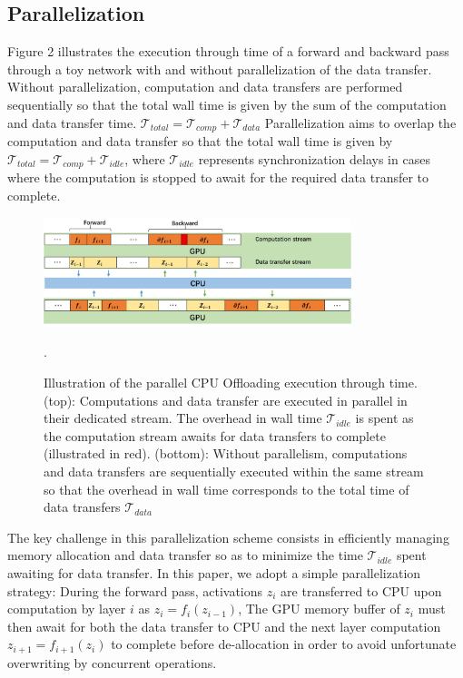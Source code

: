 \documentclass[11pt,onecolumn]{article}
\begin{document}
\subsection{Parallelization}

Figure 2 illustrates the execution through time of a forward 
and backward pass through a toy network with and without parallelization of the data transfer.
Without parallelization, computation and data transfers are performed sequentially 
so that the total wall time is given by the sum of the computation and data transfer time.
$\mathcal{T}_{total} = \mathcal{T}_{comp} + \mathcal{T}_{data}$
Parallelization aims to overlap the computation and data transfer so that the total wall time is given by
$\mathcal{T}_{total} = \mathcal{T}_{comp} + \mathcal{T}_{idle}$, where $\mathcal{T}_{idle}$ represents synchronization delays in cases where the computation is stopped to await for the required data transfer to complete.

\begin{figure}[h!]
\centering
\includegraphics[width=0.8\textwidth]{Figure2.jpg}
\caption{Illustration of the parallel CPU Offloading execution through time.
(top): Computations and data transfer are executed in parallel in their dedicated stream. 
The overhead in wall time $\mathcal{T}_{idle}$ is spent as the computation stream awaits 
for data transfers to complete (illustrated in red). 
(bottom): Without parallelism, computations and data transfers are sequentially executed within the same stream
so that the overhead in wall time corresponds to the total time of data transfers $\mathcal{T}_{data}$}.
\end{figure}


The key challenge in this parallelization scheme consists in efficiently
managing memory allocation and data transfer so as to
minimize the time $\mathcal{T}_{idle}$ spent awaiting for data transfer.
In this paper, we adopt a simple parallelization strategy:
During the forward pass, activations $z_i$ are transferred to CPU 
upon computation by layer $i$ as $z_i = f_i(z_{i-1})$,
The GPU memory buffer of $z_i$ must then await for both the data transfer to CPU and
the next layer computation $z_{i+1} = f_{i+1}(z_{i})$ to complete before de-allocation in order to
avoid unfortunate overwriting by concurrent operations.
\end{document}
